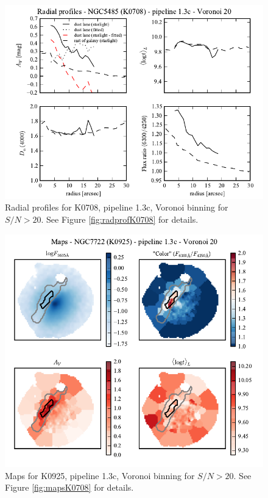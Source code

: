 \documentclass[a4paper]{article}
\begin{document}
\begin{figure}[H]
\includegraphics{figures/radprof_K0708_1.3c_v20.pdf}
\caption{Radial profiles for K0708, pipeline 1.3c, Voronoi binning for $S/N >
20$. See Figure \ref{fig:radprofK0708} for details.}
\end{figure}

\begin{figure}[H]
\includegraphics{figures/maps_K0925_1.3c_v20.pdf}
\caption{Maps for K0925, pipeline 1.3c, Voronoi binning for $S/N > 20$. See
Figure \ref{fig:mapsK0708} for details.}
\end{figure}
\end{document}
